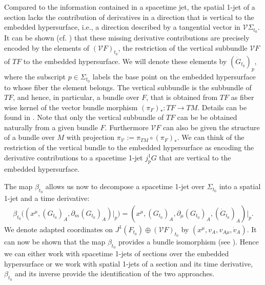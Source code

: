 Compared to the information contained in a spacetime jet, the spatial 1-jet of a section lacks the contribution of derivatives in a direction that is vertical to the embedded hypersurface, i.e., a direction described by a tangential vector in $\mathcal{V}\Sigma_{t_0}$. It can be shown (cf. \cite{1998physics...1019G}) that these missing derivative contributions are precisely encoded by the elements of
$(\mathcal{V}F)_{t_0}$, the restriction of the vertical subbundle $\mathcal{V}F$ of $TF$ to the embedded hypersurface. We will denote these elements by $(\dot{G}_{t_0})_p$, where the subscript $p\in \Sigma_{t_0}$ labels the base point on the embedded hypersurface to whose fiber the element belongs. The vertical subbundle is the subbundle of $TF$, and hence, in particular, a bundle over $F$, that is obtained from $TF$ as fiber wise kernel of the vector bundle morphism $(\pi_F)_{\ast} : TF \rightarrow
TM$. Details can be found in \cite{1998physics...1019G}. 
Note that only the vertical subbundle of $TF$ can be be obtained naturally from a given bundle $F$. Furthermore $\mathcal{V}F$ can also be given the structure of a bundle over $M$ with projection $\pi_{\mathcal{V}}:=\pi_{TM} \circ (\pi_F)_{\ast}$. We can think of the restriction of the vertical bundle to the embedded hypersurface as encoding the derivative contributions to a spacetime 1-jet $j^1_pG$ that are vertical to the embedded hypersurface.

The map $\beta_{t_0}$ allows us now to decompose a spacetime 1-jet over $\Sigma_{t_0}$ into a spatial 1-jet and a time derivative:
\begin{align}
    \beta_{t_0}\bigl ( (x^{\mu},(G_{t_0})_A, \partial_m(G_{t_0})_A) \big \vert_p \bigr ) = (x^{\mu},(G_{t_0})_A, \partial_{\mu}(G_{t_0})_A, (\dot{G}_{t_0})_A) \vert _p.
\end{align}
We denote adapted coordinates on $J^1(F_{t_0}) \oplus (\mathcal{V}F)_{t_0}$ by $(x^{\mu}, v_A, v_{A{\mu}}, \dot{v}_A)$. It can now be shown that the map $\beta_{t_0}$ provides a bundle isomorphism (see \cite{2004math.ph..11032G}). Hence we can either work with spacetime 1-jets of sections over the embedded hypersurface or we work with spatial 1-jets of a section and its time derivative, $\beta_{t_0}$ and its inverse provide the identification of the two approaches.

